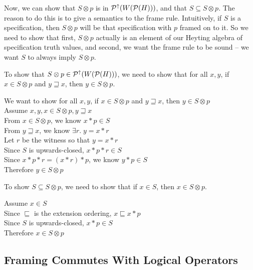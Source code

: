 Now, we can show that $S \otimes p$ is in $\mathcal{P}^{\uparrow}({W(\mathcal{P}(H)}))$, and that 
$S \subseteq S \otimes p $. The reason to do this is to give a semantics
to the frame rule. Intuitively, if $S$ is a specification, then $S \otimes p$ 
will be that specification with $p$ framed on to it. So we need to show that
first, $S \otimes p$ actually is an element of our Heyting algebra of 
specification truth values, and second, we want the frame rule to be 
sound -- we want $S$ to always imply $S \otimes p$. 

To show that $S \otimes p \in \mathcal{P}^{\uparrow}({W(\mathcal{P}(H))})$, we need to show that for all 
$x,y$, if $x \in S \otimes p$ and $y \sqsupseteq x$, then $y \in S \otimes p$. 
\\

\begin{tabbedproof}
\oo We want to show for all $x,y$, if $x \in S \otimes p$ and $y \sqsupseteq x$, then $y \in S \otimes p$ \\
\oo Assume $x, y, x \in S \otimes p, y \sqsupseteq x$ \\
\ooo From $x \in S \otimes p$, we know $x * p \in S$ \\
\ooo From $y \sqsupseteq x$, we know $\exists r.\; y = x * r$ \\
\ooo Let $r$ be the witness so that $y = x * r$ \\
\oooo Since $S$ is upwards-closed, $x * p * r \in S$ \\
\oooo Since $x * p * r = (x * r) *p$, we know  $y * p \in S$ \\
\oooo Therefore $y \in S \otimes p$ \\
\end{tabbedproof}

To show $S \subseteq S \otimes p$, we need to show that if $x \in S$, then $x \in S \otimes p$. 

\begin{tabbedproof}
\oo Assume $x \in S$ \\
\ooo Since $\sqsubseteq$ is the extension ordering, $x \sqsubseteq x * p$ \\   
\ooo Since $S$ is upwards-closed, $x * p \in S$\\
\ooo Therefore $x \in S \otimes p$ \\
\end{tabbedproof}

\subsection{Framing Commutes With Logical Operators}

